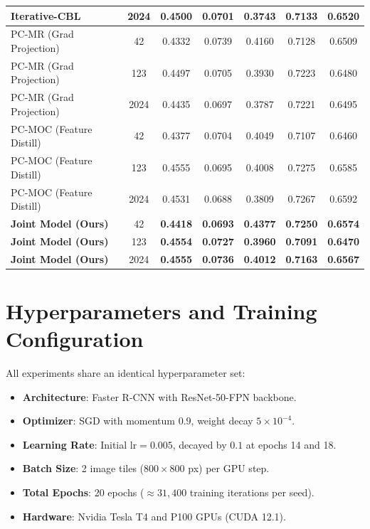 \documentclass[10pt]{article}
\begin{document}
\begin{table}[h!]
{\begin{tabular}{lcccccc}
Iterative-CBL & 2024 & 0.4500 & 0.0701 & 0.3743 & 0.7133 & 0.6520 \\
\hline
PC-MR (Grad Projection) & 42   & 0.4332 & 0.0739 & 0.4160 & 0.7128 & 0.6509 \\
PC-MR (Grad Projection) & 123  & 0.4497 & 0.0705 & 0.3930 & 0.7223 & 0.6480 \\
PC-MR (Grad Projection) & 2024 & 0.4435 & 0.0697 & 0.3787 & 0.7221 & 0.6495 \\
\hline
PC-MOC (Feature Distill) & 42   & 0.4377 & 0.0704 & 0.4049 & 0.7107 & 0.6460 \\
PC-MOC (Feature Distill) & 123  & 0.4555 & 0.0695 & 0.4008 & 0.7275 & 0.6585 \\
PC-MOC (Feature Distill) & 2024 & 0.4531 & 0.0688 & 0.3809 & 0.7267 & 0.6592 \\
\hline
\textbf{Joint Model (Ours)} & 42   & \textbf{0.4418} & \textbf{0.0693} & \textbf{0.4377} & \textbf{0.7250} & \textbf{0.6574} \\
\textbf{Joint Model (Ours)} & 123  & \textbf{0.4554} & \textbf{0.0727} & \textbf{0.3960} & \textbf{0.7091} & \textbf{0.6470} \\
\textbf{Joint Model (Ours)} & 2024 & \textbf{0.4555} & \textbf{0.0736} & \textbf{0.4012} & \textbf{0.7163} & \textbf{0.6567} \\
\hline\hline
\end{tabular}%
}
\end{table}

\section{Hyperparameters and Training Configuration}
All experiments share an identical hyperparameter set:
\begin{itemize}
    \item \textbf{Architecture}: Faster R-CNN with ResNet-50-FPN backbone.
    \item \textbf{Optimizer}: SGD with momentum $0.9$, weight decay $5 \times 10^{-4}$.
    \item \textbf{Learning Rate}: Initial $\text{lr} = 0.005$, decayed by $0.1$ at epochs 14 and 18.
    \item \textbf{Batch Size}: 2 image tiles ($800 \times 800$ px) per GPU step.
    \item \textbf{Total Epochs}: 20 epochs ($\approx 31{,}400$ training iterations per seed).
    \item \textbf{Hardware}: Nvidia Tesla T4 and P100 GPUs (CUDA 12.1).
\end{itemize}
\end{document}
